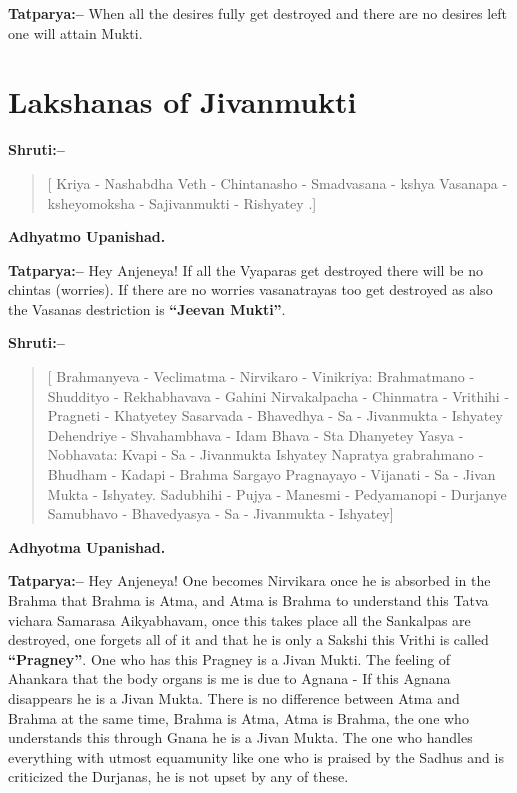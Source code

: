 \textbf{Tatparya:–} When all the desires fully get destroyed and there are no desires left one will attain Mukti.

\chapter{Lakshanas of Jivanmukti}

\textbf{Shruti:–}

\begin{verse}
[ Kriya - Nashabdha Veth - Chintanasho - Smadvasana - kshya  Vasanapa - ksheyomoksha - Sajivanmukti - Rishyatey .]
\end{verse}

\begin{flushright}
\textbf{Adhyatmo Upanishad.}
\end{flushright}

\vskip 10pt

\textbf{Tatparya:–} Hey Anjeneya! If all the Vyaparas get destroyed there will be no chintas (worries). If there are no worries vasanatrayas too get destroyed as also the Vasanas destriction is \textbf{“Jeevan Mukti”}.

\vskip 12pt

\textbf{Shruti:–}

\begin{verse}
[ Brahmanyeva - Veclimatma - Nirvikaro - Vinikriya: \break Brahmatmano - Shuddityo - Rekhabhavava - Gahini \break Nirvakalpacha - Chinmatra - Vrithihi - Pragneti - \break Khatyetey  Sasarvada - Bhavedhya - Sa - Jivanmukta - Ishyatey  Dehendriye - Shvahambhava - Idam Bhava - Sta Dhanyetey Yasya - Nobhavata: Kvapi - Sa - Jivanmukta Ishyatey  Napratya grabrahmano - Bhudham - Kadapi - Brahma Sargayo  Pragnayayo - Vijanati - Sa - Jivan Mukta - Ishyatey.  Sadubhihi - Pujya - Manesmi - Pedyamanopi - Durjanye  Samubhavo - Bhavedyasya - Sa - Jivanmukta - Ishyatey]
\end{verse}

\begin{flushright}
\textbf{Adhyotma Upanishad.}
\end{flushright}

\textbf{Tatparya:–} Hey Anjeneya! One becomes Nirvikara once he is absorbed in the Brahma that Brahma is Atma, and Atma is Brahma to understand this Tatva vichara Samarasa Aikyabhavam, once this takes place all the Sankalpas are destroyed, one forgets all of it and that he is only a Sakshi this Vrithi is called \textbf{“Pragney”}. One who has this Pragney is a Jivan Mukti. The feeling of Ahankara that the body organs is me is due to Agnana - If this Agnana disappears he is a Jivan Mukta. There is no difference between Atma and Brahma at the same time, Brahma is Atma, Atma is Brahma, the one who understands this through Gnana he is a Jivan Mukta. The one who handles everything with utmost equamunity like one who is praised by the Sadhus and is criticized the Durjanas, he is not upset by any of these.

